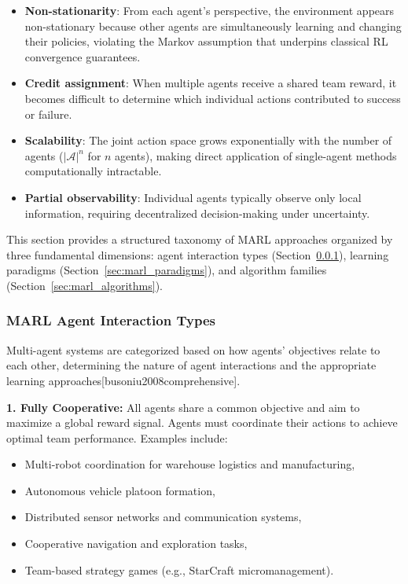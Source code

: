 \begin{itemize}
    \item \textbf{Non-stationarity}: From each agent's perspective, the environment appears non-stationary because other agents are simultaneously learning and changing their policies, violating the Markov assumption that underpins classical RL convergence guarantees.
    
    \item \textbf{Credit assignment}: When multiple agents receive a shared team reward, it becomes difficult to determine which individual actions contributed to success or failure.
    
    \item \textbf{Scalability}: The joint action space grows exponentially with the number of agents ($|\mathcal{A}|^n$ for $n$ agents), making direct application of single-agent methods computationally intractable.
    
    \item \textbf{Partial observability}: Individual agents typically observe only local information, requiring decentralized decision-making under uncertainty.
\end{itemize}

This section provides a structured taxonomy of MARL approaches organized by three fundamental dimensions: agent interaction types (Section~\ref{sec:marl_interaction}), learning paradigms (Section~\ref{sec:marl_paradigms}), and algorithm families (Section~\ref{sec:marl_algorithms}).

\subsubsection{MARL Agent Interaction Types}
\label{sec:marl_interaction}

Multi-agent systems are categorized based on how agents' objectives relate to each other, determining the nature of agent interactions and the appropriate learning approaches[busoniu2008comprehensive].

\textbf{1. Fully Cooperative:} All agents share a common objective and aim to maximize a global reward signal. Agents must coordinate their actions to achieve optimal team performance. Examples include:
\begin{itemize}
    \item Multi-robot coordination for warehouse logistics and manufacturing,
    \item Autonomous vehicle platoon formation,
    \item Distributed sensor networks and communication systems,
    \item Cooperative navigation and exploration tasks,
    \item Team-based strategy games (e.g., StarCraft micromanagement).
\end{itemize}


